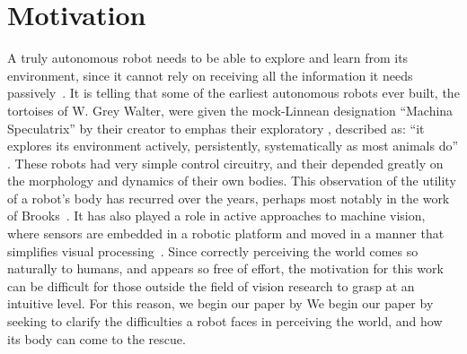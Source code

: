 
\section{Motivation}

A truly autonomous robot needs to be able to explore and learn from
its environment, since it cannot rely on receiving all the information
it needs passively~\cite{whaite97autonomous}.
It is telling that some of the earliest autonomous robots ever built,
the tortoises of W. Grey Walter, were given the mock-Linnean
designation ``Machina Speculatrix'' by their creator to emphas\ize{} their exploratory
\ahhbehavior{}, described as: ``it explores its environment actively,
persistently, systematically as most animals do''
\cite{walter50imitation}.
These robots had very simple control circuitry, and their \ahhbehavior{}
depended greatly on the morphology and dynamics of their own bodies.
%
This observation of the utility of a robot's body has recurred over
the years, perhaps most notably in the work of
Brooks~\cite{group-AAAI-98}.  It has also played a role in active
approaches to machine vision, where sensors are embedded in a robotic
platform and moved in a manner that simplifies visual
processing~\cite{ballard91animate}.
%
Since correctly perceiving the world comes so naturally to humans, and
appears so free of effort, the motivation for this work 
can be
difficult 
\ifrevised
for those outside the field of vision research
\fi
to grasp at an intuitive level.  
%
\ifrevised
For this reason, we begin our paper by
\else
We begin our paper by
\fi
seeking to clarify the difficulties a robot faces in perceiving the
world, and how its body can come to the rescue.



